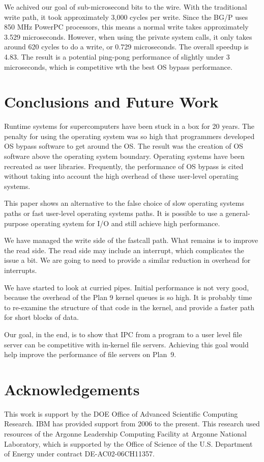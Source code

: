 \documentclass[letterpaper]{article}
\begin{document}
We achived our goal of sub-microsecond bits to the wire. With the traditional write path, it took approximately 3,000 cycles per write. Since the BG/P uses 850 MHz PowerPC processors, this means a normal write takes approximately 3.529 microseconds. However, when using the private system calls, it only takes around 620 cycles to do a write, or 0.729 microseconds. The overall speedup is 4.83. 
The result is a potential ping-pong performance of slightly under 3 microseconds, which is competitive wth the best OS bypass performance. 

\section{Conclusions and Future Work}
Runtime systems for supercomputers have been stuck in a box for 20 years. The penalty for using the operating system was so high that programmers developed OS bypass software to get around the OS. The result was the creation of OS software above the operating system boundary. Operating systems have been recreated as user libraries. Frequently, the performance of OS bypass is cited without taking into account the high overhead of these user-level operating systems. 

This paper shows an alternative to the false choice of slow operating systems paths or fast user-level operating systems paths. It is possible to use a general-purpose operating system for I/O and still achieve high performance. 

We have managed the write side of the fastcall path. What remains is to improve the read side. The read side may include an interrupt, which complicates the issue a bit. We are going to need to provide a similar reduction in overhead for interrupts. 

We have started to look at curried pipes. Initial performance is not very good, because the overhead of 
the Plan 9 kernel queues is so high. It is probably time to re-examine the structure of that code in the kernel, and provide 
a faster path for short blocks of data. 

Our goal, in the end, is to show that IPC from a program to a user level file server can be competitive 
with in-kernel file servers. Achieving this goal would help improve the performance of file servers on Plan~9. 
\section{Acknowledgements}
This work is support by the DOE Office of Advanced Scientific Computing Research. IBM has provided support from 2006 to the present. This research used resources of the Argonne Leadership Computing Facility
 at Argonne National Laboratory, which is supported by the Office of Science
 of the U.S.
 Department of Energy under contract DE-AC02-06CH11357.

 

\end{document}
